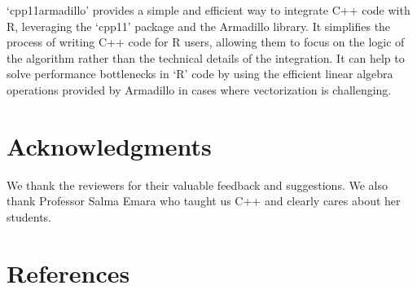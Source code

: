 \documentclass[preprint,12pt, a4paper]{elsarticle}
\begin{document}
`cpp11armadillo' provides a simple and efficient way to integrate C++
code with R, leveraging the `cpp11' package and the Armadillo library.
It simplifies the process of writing C++ code for R users, allowing them
to focus on the logic of the algorithm rather than the technical details
of the integration. It can help to solve performance bottlenecks in `R'
code by using the efficient linear algebra operations provided by
Armadillo in cases where vectorization is challenging.

\section{Acknowledgments}\label{acknowledgments}

We thank the reviewers for their valuable feedback and suggestions. We
also thank Professor Salma Emara who taught us C++ and clearly cares
about her students.

\section*{References}\label{references}
\end{document}
